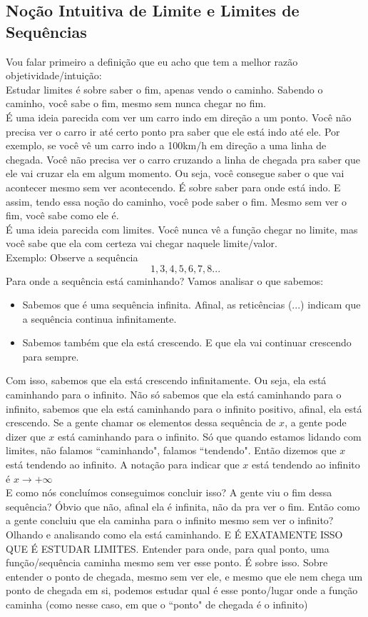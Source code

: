\documentclass{article}
\begin{document}
\subsection{Noção Intuitiva de Limite e Limites de Sequências}
Vou falar primeiro a definição que eu acho que tem a melhor razão objetividade/intuição:
\\[2pt]
Estudar limites é sobre saber o fim, apenas vendo o caminho. Sabendo o caminho, você sabe o fim, mesmo sem nunca chegar no fim.
\\[2pt]
É uma ideia parecida com ver um carro indo em direção a um ponto. Você não precisa ver o carro ir até certo ponto pra saber que ele está indo até ele. Por exemplo, se você vê um carro indo a 100km/h em direção a uma linha de chegada. Você não precisa ver o carro cruzando a linha de chegada pra saber que ele vai cruzar ela em algum momento. Ou seja, você consegue saber o que vai acontecer mesmo sem ver acontecendo. É sobre saber para onde está indo. E assim, tendo essa noção do caminho, você pode saber o fim. Mesmo sem ver o fim, você sabe como ele é. 
\\[2pt]
É uma ideia parecida com limites. Você nunca vê a função chegar no limite, mas você sabe que ela com certeza vai chegar naquele limite/valor.
\\[2pt]
Exemplo: Observe a sequência
\[
1,3,4,5,6,7,8...
\]
Para onde a sequência está caminhando? Vamos analisar o que sabemos: 
\begin{itemize}
    \item Sabemos que é uma sequência infinita. Afinal, as reticências (...) indicam que a sequência continua infinitamente.

    \item Sabemos também que ela está crescendo. E que ela vai continuar crescendo para sempre.
\end{itemize}
Com isso, sabemos que ela está crescendo infinitamente. Ou seja, ela está caminhando para o infinito. Não só sabemos que ela está caminhando para o infinito, sabemos que ela está caminhando para o infinito positivo, afinal, ela está crescendo. Se a gente chamar os elementos dessa sequência de $x$, a gente pode dizer que $x$ está caminhando para o infinito. Só que quando estamos lidando com limites, não falamos ``caminhando", falamos ``tendendo". Então dizemos que $x$ está tendendo ao infinito. A notação para indicar que $x$ está tendendo ao infinito é $x \to +\infty$
\\[2pt]
E como nós concluímos conseguimos concluir isso? A gente viu o fim dessa sequência? Óbvio que não, afinal ela é infinita, não da pra ver o fim. Então como a gente concluiu que ela caminha para o infinito mesmo sem ver o infinito? Olhando e analisando como ela está caminhando. E É EXATAMENTE ISSO QUE É ESTUDAR LIMITES. Entender para onde, para qual ponto, uma função/sequência caminha mesmo sem ver esse ponto. É sobre isso. Sobre entender o ponto de chegada, mesmo sem ver ele, e mesmo que ele nem chega um ponto de chegada em si, podemos estudar qual é esse ponto/lugar onde a função caminha (como nesse caso, em que o ``ponto" de chegada é o infinito)
\end{document}
